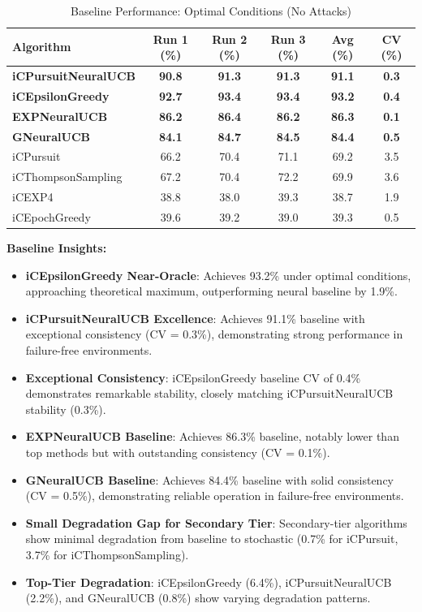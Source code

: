 \documentclass[12pt,a4paper]{article}
\newcommand{\primarytext}[1]{\textcolor{primaryblue}{\textbf{#1}}}
\newcommand{\secondarytext}[1]{\textcolor{secondaryblue}{\textbf{#1}}}
\newcommand{\warning}[1]{\textcolor{warningred}{\textbf{#1}}}
\newcommand{\legacy}[1]{\textcolor{legacycolor}{\textbf{#1}}}
\newcommand{\neural}[1]{\textcolor{neuralcolor}{\textbf{#1}}}
\begin{document}
\begin{table}[H]
\centering
\caption{Baseline Performance: Optimal Conditions (No Attacks)}
\label{tab:baseline-performance}
\begin{tabular}{@{}lccccc@{}}
\toprule
\textbf{Algorithm} & \textbf{Run 1 (\%)} & \textbf{Run 2 (\%)} & \textbf{Run 3 (\%)} & \textbf{Avg (\%)} & \textbf{CV (\%)} \\
\midrule
\neural{iCPursuitNeuralUCB}   & \neural{90.8} & \neural{91.3} & \neural{91.3} & \neural{91.1} & \neural{0.3} \\
\primarytext{iCEpsilonGreedy}   & \primarytext{92.7} & \primarytext{93.4} & \primarytext{93.4} & \primarytext{93.2} & \primarytext{0.4} \\
\legacy{EXPNeuralUCB}           & \legacy{86.2} & \legacy{86.4} & \legacy{86.2} & \legacy{86.3} & \legacy{0.1} \\
\neural{GNeuralUCB}            & \neural{84.1} & \neural{84.7} & \neural{84.5} & \neural{84.4} & \neural{0.5} \\
iCPursuit                       & 66.2 & 70.4 & 71.1 & 69.2 & 3.5 \\
iCThompsonSampling              & 67.2 & 70.4 & 72.2 & 69.9 & 3.6 \\
iCEXP4                          & 38.8 & 38.0 & 39.3 & 38.7 & 1.9 \\
iCEpochGreedy                   & 39.6 & 39.2 & 39.0 & 39.3 & 0.5 \\
\bottomrule
\end{tabular}
\end{table}

\textbf{Baseline Insights:}
\begin{itemize}
\item \primarytext{iCEpsilonGreedy Near-Oracle}: Achieves 93.2\% under optimal conditions, approaching theoretical maximum, outperforming neural baseline by 1.9\%.
\item \neural{iCPursuitNeuralUCB Excellence}: Achieves 91.1\% baseline with exceptional consistency (CV = 0.3\%), demonstrating strong performance in failure-free environments.
\item \primarytext{Exceptional Consistency}: iCEpsilonGreedy baseline CV of 0.4\% demonstrates remarkable stability, closely matching iCPursuitNeuralUCB stability (0.3\%).
\item \legacy{EXPNeuralUCB Baseline}: Achieves 86.3\% baseline, notably lower than top methods but with outstanding consistency (CV = 0.1\%).
\item \neural{GNeuralUCB Baseline}: Achieves 84.4\% baseline with solid consistency (CV = 0.5\%), demonstrating reliable operation in failure-free environments.
\item \secondarytext{Small Degradation Gap for Secondary Tier}: Secondary-tier algorithms show minimal degradation from baseline to stochastic (0.7\% for iCPursuit, 3.7\% for iCThompsonSampling).
\item \warning{Top-Tier Degradation}: iCEpsilonGreedy (6.4\%), iCPursuitNeuralUCB (2.2\%), and GNeuralUCB (0.8\%) show varying degradation patterns.
\end{itemize}
\end{document}
